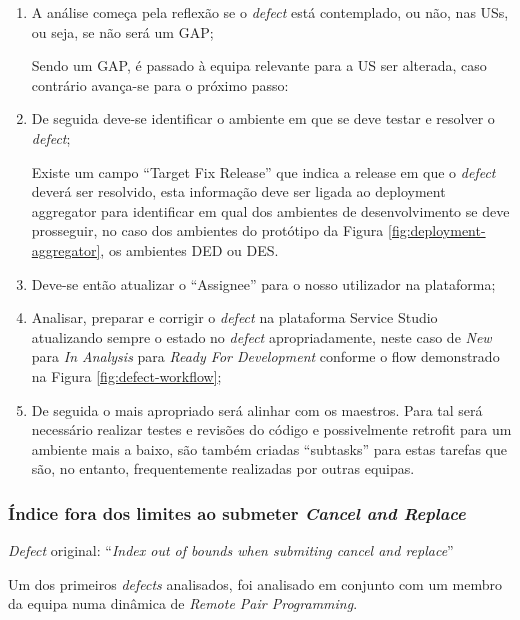             \begin{enumerate}
                \item A análise começa pela reflexão se o \textit{defect} está contemplado, ou não, nas USs, ou seja, se não será um GAP;
                
                Sendo um GAP, é passado à equipa relevante para a US ser alterada, caso contrário avança-se para o próximo passo: 
                \item De seguida deve-se identificar o ambiente em que se deve testar e resolver o \textit{defect};
                
                Existe um campo ``Target Fix Release'' que indica a release em que o \textit{defect} deverá ser resolvido, esta informação deve ser ligada ao deployment aggregator para identificar em qual dos ambientes de desenvolvimento se deve prosseguir, no caso dos ambientes do protótipo da Figura \ref{fig:deployment-aggregator}, os ambientes DED ou DES.  
                \item Deve-se então atualizar o ``Assignee'' para o nosso utilizador na plataforma;
                \item Analisar, preparar e corrigir o \textit{defect} na plataforma Service Studio atualizando sempre o estado no \textit{defect} apropriadamente, neste caso de \textit{New} para \textit{In Analysis} para \textit{Ready For Development} conforme o flow demonstrado na Figura \ref{fig:defect-workflow};
                \item De seguida o mais apropriado será alinhar com os maestros. Para tal será necessário realizar testes e revisões do código e possivelmente retrofit para um ambiente mais a baixo, são também criadas ``subtasks'' para estas tarefas que são, no entanto,  frequentemente realizadas por outras equipas. 
            \end{enumerate}

        \subsubsection{Índice fora dos limites ao submeter \textit{Cancel and Replace}}\label{index_out_of_bounds_defect}

        \textit{Defect} original: ``\textit{Index out of bounds when submiting cancel and replace}''


            Um dos primeiros \textit{defects} analisados, foi analisado em conjunto com um membro da equipa numa dinâmica de \textit{Remote Pair Programming}.


